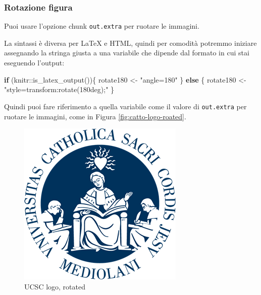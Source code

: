 \documentclass[a4paper, 11pt, nobind]{templates/ociamthesis}
\newenvironment{Shaded}{\begin{snugshade}}{\end{snugshade}}
\newcommand{\ControlFlowTok}[1]{\textcolor[rgb]{0.13,0.29,0.53}{\textbf{#1}}}
\newcommand{\FunctionTok}[1]{\textcolor[rgb]{0.00,0.00,0.00}{#1}}
\newcommand{\NormalTok}[1]{#1}
\newcommand{\OtherTok}[1]{\textcolor[rgb]{0.56,0.35,0.01}{#1}}
\newcommand{\SpecialCharTok}[1]{\textcolor[rgb]{0.00,0.00,0.00}{#1}}
\newcommand{\StringTok}[1]{\textcolor[rgb]{0.31,0.60,0.02}{#1}}
\renewenvironment{Shaded}
{
  \vspace{10pt}%
  \begin{snugshade}%
}{%
  \end{snugshade}%
  \vspace{8pt}%
}
\begin{document}
\hypertarget{rotazione-figura}{%
\subsubsection*{Rotazione figura}\label{rotazione-figura}}

Puoi usare l'opzione chunk \texttt{out.extra} per ruotare le immagini.

La sintassi è diversa per LaTeX e HTML, quindi per comodità potremmo iniziare assegnando la stringa giusta a una variabile che dipende dal formato in cui stai eseguendo l'output:

\begin{Shaded}
\begin{Highlighting}[]
\ControlFlowTok{if}\NormalTok{ (knitr}\SpecialCharTok{::}\FunctionTok{is\_latex\_output}\NormalTok{())\{}
\NormalTok{  rotate180 }\OtherTok{\textless{}{-}} \StringTok{"angle=180"}
\NormalTok{\} }\ControlFlowTok{else}\NormalTok{ \{}
\NormalTok{  rotate180 }\OtherTok{\textless{}{-}} \StringTok{"style=\textquotesingle{}transform:rotate(180deg);\textquotesingle{}"}
\NormalTok{\}}
\end{Highlighting}
\end{Shaded}

Quindi puoi fare riferimento a quella variabile come il valore di \texttt{out.extra} per ruotare le immagini, come in Figura \ref{fig:catto-logo-roated}.

\begin{figure}

{\centering \includegraphics[width=0.5\linewidth,angle=180]{figures/sample-content/cattolica-logo} 

}

\caption{UCSC logo, rotated}\label{fig:catto-logo-rotated}
\end{figure}
\end{document}
